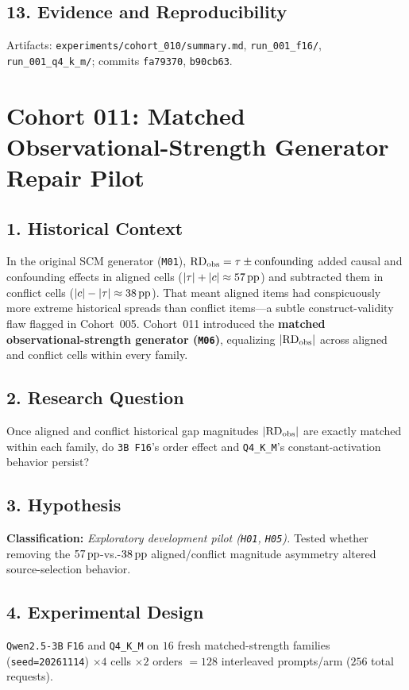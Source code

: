 \subsection*{13. Evidence and Reproducibility}
Artifacts: \texttt{experiments/cohort\_010/summary.md}, \texttt{run\_001\_f16/}, \texttt{run\_001\_q4\_k\_m/}; commits \texttt{fa79370}, \texttt{b90cb63}.

\section{Cohort 011: Matched Observational-Strength Generator Repair Pilot}

\subsection*{1. Historical Context}
In the original SCM generator (\texttt{M01}), $\mathrm{RD}_{\mathrm{obs}} = \tau \pm \text{confounding}$ added causal and confounding effects in aligned cells ($|\tau| + |c| \approx 57\,\mathrm{pp}$) and subtracted them in conflict cells ($|c| - |\tau| \approx 38\,\mathrm{pp}$). That meant aligned items had conspicuously more extreme historical spreads than conflict items---a subtle construct-validity flaw flagged in Cohort~005. Cohort~011 introduced the \textbf{matched observational-strength generator (\texttt{M06})}, equalizing $|\mathrm{RD}_{\mathrm{obs}}|$ across aligned and conflict cells within every family.

\subsection*{2. Research Question}
Once aligned and conflict historical gap magnitudes $|\mathrm{RD}_{\mathrm{obs}}|$ are exactly matched within each family, do \texttt{3B F16}'s order effect and \texttt{Q4\_K\_M}'s constant-activation behavior persist?

\subsection*{3. Hypothesis}
\textbf{Classification:} \emph{Exploratory development pilot (\texttt{H01}, \texttt{H05}).} Tested whether removing the $57\,\mathrm{pp}$-vs.-$38\,\mathrm{pp}$ aligned/conflict magnitude asymmetry altered source-selection behavior.

\subsection*{4. Experimental Design}
\texttt{Qwen2.5-3B} \texttt{F16} and \texttt{Q4\_K\_M} on $16$ fresh matched-strength families (\texttt{seed=20261114}) $\times 4$ cells $\times 2$ orders $= 128$ interleaved prompts/arm ($256$ total requests).

